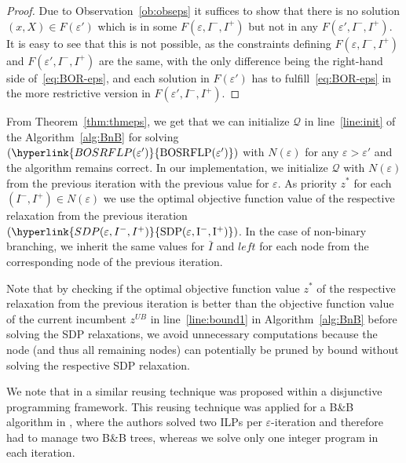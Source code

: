 \documentclass{article}
\newcommand{\myrefmath}[1]{(\hyperlink{#1}{\mathrm{#1}})}
\newcommand{\BB}{B\&B\xspace}
\begin{document}
\begin{proof}
Due to Observation~\ref{ob:obseps} it suffices to show that there is no solution $(x,X) \in F(\varepsilon')$ which is in some $F(\varepsilon,I^-,I^+)$ but not in any $F(\varepsilon',I^-,I^+)$. It is easy to see that this is not possible, as the constraints defining $F(\varepsilon,I^-,I^+)$ and $F(\varepsilon',I^-,I^+)$ are the same, with the only difference being the right-hand side of~\eqref{eq:BOR-eps}, and each solution in $F(\varepsilon')$ has to fulfill~\eqref{eq:BOR-eps} in the more restrictive version in $F(\varepsilon',I^-,I^+)$.
\end{proof}
From Theorem~\ref{thm:thmeps}, we get that we can initialize $\mathcal Q$ in line~\ref{line:init} of the Algorithm~\ref{alg:BnB} for solving $\myrefmath{BOSRFLP(\varepsilon')}$ with $N(\varepsilon)$ for any $\varepsilon>\varepsilon'$ and the algorithm remains correct. In our implementation, we initialize $\mathcal Q$ with $N(\varepsilon)$ from the previous iteration with the previous value for $\varepsilon$. As priority $z^*$ for each $(I^-,I^+) \in N(\varepsilon)$ we use the optimal objective function value of the respective relaxation from the previous iteration $\myrefmath{SDP(\varepsilon,I^-,I^+)}$. In the case of non-binary branching, we inherit the same values for $\bar{I}$ and $left$ for each node from the corresponding node of the previous iteration.

Note that by checking if the optimal objective function value $z^*$ of the respective relaxation from the previous iteration is better than the objective function value of the current incumbent $z^{UB}$ in line~\ref{line:bound1} in Algorithm~\ref{alg:BnB} before solving the SDP relaxations, we avoid unnecessary computations because the node (and thus all remaining nodes) can potentially be pruned by bound without solving the respective SDP relaxation.

We note that in \citet{KLEIN1982} a similar reusing technique was proposed within a disjunctive programming framework.
This reusing technique was applied for a \BB algorithm in \citet{SAYIN1999435}, where the authors solved two ILPs per $\varepsilon$-iteration and therefore had to manage two \BB trees, whereas we solve only one integer program in each iteration.
\end{document}
